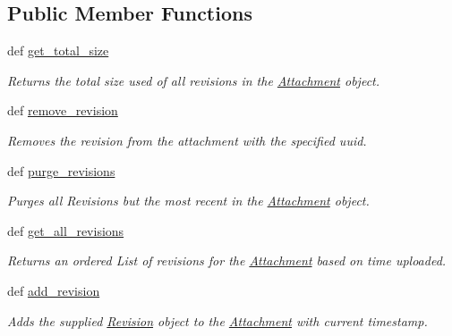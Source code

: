 \subsection*{Public Member Functions}
\begin{DoxyCompactItemize}
\item 
def \hyperlink{class_learn_1_1models_1_1_attachment_ad4529524ec5ff145986650657ee7a6fc}{get\-\_\-total\-\_\-size}
\begin{DoxyCompactList}\small\item\em Returns the total size used of all revisions in the \hyperlink{class_learn_1_1models_1_1_attachment}{Attachment} object. \end{DoxyCompactList}\item 
def \hyperlink{class_learn_1_1models_1_1_attachment_a022020821925beeb6da12429a75887e0}{remove\-\_\-revision}
\begin{DoxyCompactList}\small\item\em Removes the revision from the attachment with the specified uuid. \end{DoxyCompactList}\item 
\hypertarget{class_learn_1_1models_1_1_attachment_aee9d2a2edad4cd28e20720ab3b0242d4}{def \hyperlink{class_learn_1_1models_1_1_attachment_aee9d2a2edad4cd28e20720ab3b0242d4}{purge\-\_\-revisions}}\label{class_learn_1_1models_1_1_attachment_aee9d2a2edad4cd28e20720ab3b0242d4}

\begin{DoxyCompactList}\small\item\em Purges all Revisions but the most recent in the \hyperlink{class_learn_1_1models_1_1_attachment}{Attachment} object. \end{DoxyCompactList}\item 
def \hyperlink{class_learn_1_1models_1_1_attachment_a69cb6737bc80199fd2e79ab1a725f05e}{get\-\_\-all\-\_\-revisions}
\begin{DoxyCompactList}\small\item\em Returns an ordered List of revisions for the \hyperlink{class_learn_1_1models_1_1_attachment}{Attachment} based on time uploaded. \end{DoxyCompactList}\item 
def \hyperlink{class_learn_1_1models_1_1_attachment_a72fddbf30122110730c771f20b8a5714}{add\-\_\-revision}
\begin{DoxyCompactList}\small\item\em Adds the supplied \hyperlink{class_learn_1_1models_1_1_revision}{Revision} object to the \hyperlink{class_learn_1_1models_1_1_attachment}{Attachment} with current timestamp. \end{DoxyCompactList}\end{DoxyCompactItemize}
